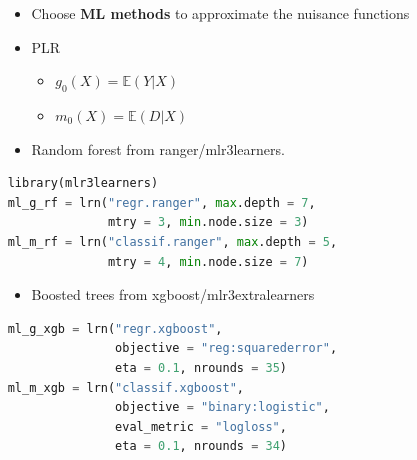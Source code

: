 \begin{frame}[fragile]
\begin{columns}
\begin{column}{0.3\textwidth}
\end{column}
\begin{column}{0.7\textwidth}
\begin{itemize}
\item Choose \textbf{ML methods} to approximate the nuisance functions
\item PLR
\begin{itemize}
\item $g_0(X) = \mathbb{E}(Y|X)$
\item $m_0(X) = \mathbb{E}(D|X)$
\end{itemize}
\item Random forest from ranger/mlr3learners.
\end{itemize}
{\tiny
\begin{lstlisting}[language=Python,
backgroundcolor = \color{gray!20},
keywordstyle=\color{OliveGreen}, stringstyle=\color{BrickRed}]
library(mlr3learners)
ml_g_rf = lrn("regr.ranger", max.depth = 7,
              mtry = 3, min.node.size = 3)
ml_m_rf = lrn("classif.ranger", max.depth = 5,
              mtry = 4, min.node.size = 7)
\end{lstlisting}
}
\begin{itemize}
\item Boosted trees from xgboost/mlr3extralearners
\end{itemize}
{\tiny
\begin{lstlisting}[language=Python,
backgroundcolor = \color{gray!20},
keywordstyle=\color{OliveGreen}, stringstyle=\color{BrickRed}]
ml_g_xgb = lrn("regr.xgboost",
               objective = "reg:squarederror",
               eta = 0.1, nrounds = 35)
ml_m_xgb = lrn("classif.xgboost",
               objective = "binary:logistic",
               eval_metric = "logloss",
               eta = 0.1, nrounds = 34)
\end{lstlisting}
}
\end{column}
\end{columns}
\end{frame}


